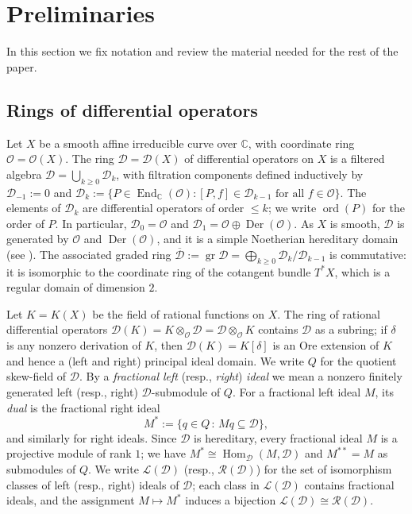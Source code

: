 \documentclass[11pt,reqno]{amsart}
\theoremstyle{plain}
\theoremstyle{definition}
\theoremstyle{remark}
\numberwithin{equation}{section}
\newcommand{\cD}{\mathcal{D}}
\newcommand{\cO}{\mathcal{O}}
\newcommand{\cL}{\mathcal{L}}
\newcommand{\cR}{\mathcal{R}}
\newcommand{\C}{\mathbb{C}}
\newcommand{\bD}{\overline{\cD}}
\DeclareMathOperator{\Hom}{Hom}
\DeclareMathOperator{\End}{End}
\DeclareMathOperator{\Der}{Der}
\DeclareMathOperator{\gr}{gr}
\DeclareMathOperator{\ord}{ord}
\begin{document}
\section{Preliminaries}
\label{S2}

In this section we fix notation and review the material needed for the rest of the paper.

\subsection{Rings of differential operators}
\label{S2.1}
Let $X$ be a smooth affine irreducible curve over $\C$, with coordinate ring $\cO = \cO(X)$. The
ring $\cD = \cD(X)$ of differential operators on $X$ is a filtered algebra
$\cD = \bigcup_{k \ge 0} \cD_k$, with filtration components defined inductively by
$\cD_{-1} := 0$ and
$\cD_k := \{ P \in \End_{\C}(\cO) : [P, f] \in \cD_{k-1} \text{ for all } f \in \cO\}$. The
elements of $\cD_k$ are differential operators of order $\le k$; we write $\ord(P)$ for the order
of $P$. In particular, $\cD_0 = \cO$ and $\cD_1 = \cO \oplus \Der(\cO)$. As $X$ is smooth, $\cD$ is
generated by $\cO$ and $\Der(\cO)$, and it is a simple Noetherian hereditary domain (see
\cite[Chapter~15]{McConnell}). The associated graded ring
$\bD := \gr \cD = \bigoplus_{k \ge 0} \cD_k/\cD_{k-1}$ is commutative: it is isomorphic to the
coordinate ring of the cotangent bundle $T^*X$, which is a regular domain of dimension $2$.

Let $K = K(X)$ be the field of rational functions on $X$. The ring of rational differential
operators $\cD(K) = K \otimes_{\cO} \cD = \cD \otimes_{\cO} K$ contains $\cD$ as a subring; if
$\delta$ is any nonzero derivation of $K$, then $\cD(K) = K[\delta]$ is an Ore extension of $K$
and hence a (left and right) principal ideal domain. We write $Q$ for the quotient skew-field of
$\cD$. By a \emph{fractional left} (resp., \emph{right}) \emph{ideal} we mean a nonzero finitely
generated left (resp., right) $\cD$-submodule of $Q$. For a fractional left ideal $M$, its
\emph{dual} is the fractional right ideal
\begin{equation}
\label{E21}
  M^* := \{ q \in Q \, : \, M q \subseteq \cD \} ,
\end{equation}
and similarly for right ideals. Since $\cD$ is hereditary, every fractional ideal $M$ is a
projective module of rank $1$; we have $M^* \cong \Hom_{\cD}(M, \cD)$ and $M^{**} = M$ as
submodules of $Q$. We write $\cL(\cD)$ (resp., $\cR(\cD)$) for the set of isomorphism classes of
left (resp., right) ideals of $\cD$; each class in $\cL(\cD)$ contains fractional ideals, and the
assignment $M \mapsto M^*$ induces a bijection $\cL(\cD) \cong \cR(\cD)$.
\end{document}
